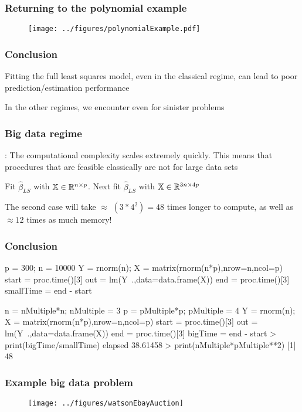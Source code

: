 \documentclass{beamer}
\begin{document}
\begin{frame}
\frametitle{Returning to the polynomial example}
\begin{figure}
\centering
  \texttt{[image: ../figures/polynomialExample.pdf]}
\end{figure}
\end{frame}


\begin{frame}
\frametitle{Conclusion}
 Fitting the full least squares model, even in the classical regime,
can lead to poor prediction/estimation performance

\vsp
In the other regimes, we encounter even for sinister problems
\end{frame}


\begin{frame}
\frametitle{Big data regime}
: The computational complexity scales extremely quickly.  This means that 
procedures that are feasible classically are not for large data sets

\vsp
{} Fit $\hat\beta_{LS}$ with $\mathbb{X} \in \mathbb{R}^{ n \times p}$.  Next 
fit $\hat\beta_{LS}$ with $\mathbb{X} \in \mathbb{R}^{ 3n \times 4p}$

\vsp
The second case will take $\approx$ $(3*4^2) = 48$ times longer to compute, as well as 
$\approx 12$ times as much memory!

\end{frame}

\begin{frame}[fragile]
\frametitle{Conclusion}
\begin{blockcode}
p = 300; n = 10000
Y = rnorm(n); X = matrix(rnorm(n*p),nrow=n,ncol=p)
start = proc.time()[3]
out   = lm(Y~.,data=data.frame(X))
end   = proc.time()[3]
smallTime = end - start

n = nMultiple*n; nMultiple = 3
p = pMultiple*p; pMultiple = 4
Y = rnorm(n); X = matrix(rnorm(n*p),nrow=n,ncol=p)
start = proc.time()[3]
out   = lm(Y~.,data=data.frame(X))
end   = proc.time()[3]
bigTime = end - start
> print(bigTime/smallTime)
 elapsed 
38.61458 
> print(nMultiple*pMultiple**2)
[1] 48
\end{blockcode}
\end{frame}

\begin{frame}
\frametitle{Example big data problem}
\begin{figure}[h]
   \centering
   \texttt{[image: ../figures/watsonEbayAuction]} %
\end{figure}


\end{frame}
\end{document}
